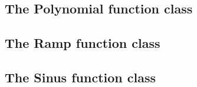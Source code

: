 

\subsection{The Polynomial function class}

\subsection{The Ramp function class}

\subsection{The Sinus function class}

